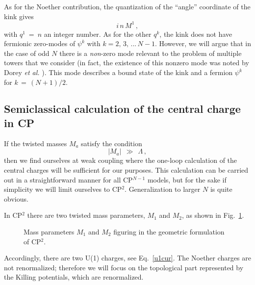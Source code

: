 \documentclass[epsfig,12pt]{article}
\def\beq{\begin{equation}}
\def\eeq{\end{equation}}
\def\beq{\begin{equation}}
\def\eeq{\end{equation}}
\begin{document}
	As for the Noether contribution, the quantization of the ``angle'' coordinate of the kink gives 
\beq
	i\, n\, M^1\,,
\eeq
	with $ q^1 ~=~ n $ an integer number.
	As for the other $ q^k $, the kink does not have fermionic zero-modes of $ \psi^k $ with $ k = 2,\, 3,\, ...\, N-1 $.
	However, we will argue that in the case of odd $ N $ there is a
	{\it non}-zero mode relevant to the problem of multiple towers that we consider (in fact, 
	the existence of this nonzero mode was noted by Dorey {\it et al.} \cite{Dorey:1999zk}).
	This mode describes a bound state of the kink and a fermion $ \psi^k $ for $ k \,=\, (N+1)/2 $.
     
\subsection{Semiclassical calculation of the central charge in CP}
     \label{semclas}
     
	If the twisted masses $M_a$ satisfy the condition
\beq
	| M_a | ~~\gg~~ \Lambda\,,
\eeq
	then we find ourselves at weak coupling where the one-loop calculation of the
	central charges will be sufficient for our purposes. 
	This calculation can be carried out in a straightforward manner for all CP$^{N-1}$ models, 
	but for the sake if simplicity we will limit ourselves to CP$^2$. 
	Generalization to larger $N$ is quite obvious. 
	
	In CP$^2$ there are two twisted mass parameters, $M_1$ and $M_2$, as shown in Fig.~\ref{fM}.
\begin{figure}
\begin{center}
\epsfxsize=5.0cm
\caption{Mass parameters $ M_1 $ and $ M_2 $ figuring in the geometric formulation of CP$^2$.}
\label{fM}
\end{center}
\end{figure}
	Accordingly, there are two U(1) charges, see Eq.~\eqref{u1cur}. 
	The Noether charges are not renormalized; 
	therefore we will focus on the topological part represented by the Killing potentials, 
	which are renormalized. 


\end{document}
